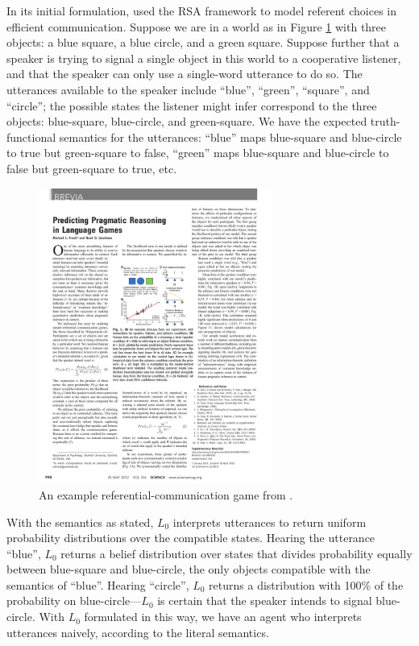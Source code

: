 \documentclass{sp}
\begin{document}
In its initial formulation, \cite{frankgoodman2012} used the RSA framework to model referent choices in efficient communication. Suppose we are in a world as in Figure \ref{ref-game} with three objects: a blue square, a blue circle, and a green square. Suppose further that a speaker is trying to signal a single object in this world to a cooperative listener, and that the speaker can only use a single-word utterance to do so. The utterances available to the speaker include ``blue'', ``green'', ``square'', and ``circle''; the possible states the listener might infer correspond to the three objects: blue-square, blue-circle, and green-square. We have the expected truth-functional semantics for the utterances: ``blue'' maps blue-square and blue-circle to true but green-square to false, ``green'' maps blue-square and blue-circle to false but green-square to true, etc.

\begin{figure}[t]
\centering
\includegraphics[width=3in]{rsa-scene.pdf}
\caption{An example referential-communication game from \cite{frankgoodman2012}.}
\label{ref-game}
\end{figure}

With the semantics as stated, $L_0$ interprets utterances to return uniform probability distributions over the compatible states. Hearing the utterance ``blue'', $L_0$ returns a belief distribution over states that divides probability equally between blue-square and blue-circle, the only objects compatible with the semantics of ``blue''. Hearing ``circle'', $L_0$ returns a distribution with 100\% of the probability on blue-circle---$L_0$ is certain that the speaker intends to signal blue-circle. With $L_0$ formulated in this way, we have an agent who interprets utterances naively, according to the literal semantics. 
\end{document}

